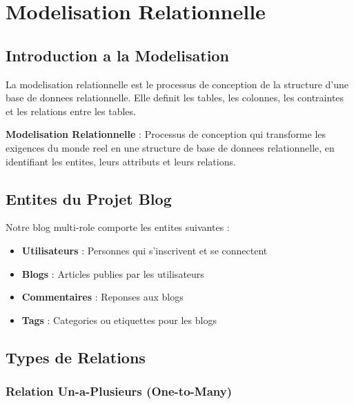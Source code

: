 \documentclass[a4paper,12pt]{book}
\begin{document}
\chapter{Modelisation Relationnelle}

\section{Introduction a la Modelisation}

La modelisation relationnelle est le processus de conception de la structure d'une base de donnees relationnelle. Elle definit les tables, les colonnes, les contraintes et les relations entre les tables.

\begin{definitionbox}
    \textbf{Modelisation Relationnelle} : Processus de conception qui transforme les exigences du monde reel en une structure de base de donnees relationnelle, en identifiant les entites, leurs attributs et leurs relations.
\end{definitionbox}

\section{Entites du Projet Blog}

Notre blog multi-role comporte les entites suivantes :

\begin{itemize}
    \item \textbf{Utilisateurs} : Personnes qui s'inscrivent et se connectent
    \item \textbf{Blogs} : Articles publies par les utilisateurs
    \item \textbf{Commentaires} : Reponses aux blogs
    \item \textbf{Tags} : Categories ou etiquettes pour les blogs
\end{itemize}

\section{Types de Relations}

\subsection{Relation Un-a-Plusieurs (One-to-Many)}
\end{document}
